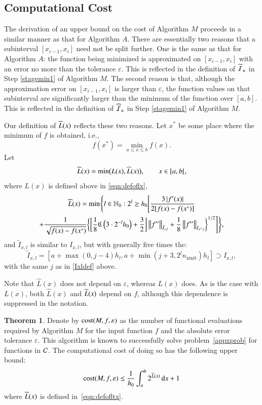 \documentclass[review]{elsarticle}
\newcommand{\abstol}{\varepsilon}
\theoremstyle{definition}
\newcommand{\Ixl}{I_{x,l}}
\newcommand{\chL}{\widehat{L}}
\DeclareMathOperator{\ninit}{ninit}
\newtheorem{theorem}{Theorem}
\begin{document}
\subsection{Computational Cost} \label{subsec:optcost}
The derivation of an upper bound on the cost of Algorithm $M$ proceeds in a
similar manner as that for Algorithm $A$. There are essentially two reasons that a
subinterval $[x_{i-1},x_i]$ need not be split further. One is the same as that
for Algorithm $A$: the function being minimized is approximated on
$[x_{i-1},x_i]$ with an error no more than the tolerance $\abstol$. This is reflected in the definition of $\widetilde{\mathcal{I}}_{\pm}$ in Step \ref{stagemin1} of Algorithm $M$.  The second
reason is that, although the approximation error on $[x_{i-1},x_i]$ is larger
than $\abstol$, the function values on that subinterval are significantly larger
than the minimum of the function over $[a,b]$.  This is reflected in the definition of $\widehat{\mathcal{I}}_{\pm}$ in Step \ref{stagemin1} of Algorithm $M$. 

Our definition of $\widetilde{L}(x)$ reflects these two reasons. Let $x^*$ be some place
where the minimum of $f$ is obtained, i.e.,
\[
f(x^*)  = \min_{a \le x \le b} f(x).
\]
Let
\begin{equation}\label{eqn:defofltx}
\tL(x) = \min\bigl(L(x),\chL(x)\bigr), \qquad x \in [a,b[,
\end{equation}
where $L(x)$ is defined above in \eqref{eqn:defoflx}, 
\begin{multline}\label{eqn:defoflt1x}
\chL(x) = \min \Biggl\{ l \in \mathbb{N}_0 :  2^l \ge h_0 \Biggl[ \frac{3\abs{f'(x)}}{2[f(x) - f(x^*)]} \\
+  \frac{1}{\sqrt{f(x) - f(x^*)}} \biggl\{ \biggl[\frac 18 \fC\left(3\cdot2^{-l}h_0\right) + \frac 32 \biggr]   \norm[\tilde{I}_{x,l}]{f''}
+ \frac18\norm[{I_{x^*,l}}]{f''} \biggr\}^{1/2} \Biggr] \Biggr\},
\end{multline}
and $\tilde{I}_{x,l}$ is similar to $\Ixl$, but with generally five times the:
\begin{equation}
\tilde{I}_{x,l}=\left[a+\max(0,j-4)h_l, a+ \min(j+3,2^l n_{\ninit})h_l\right] \supset \Ixl,
\end{equation}
with the same $j$ as in \eqref{Ixldef} above. 


Note that $\chL(x)$ does not depend on $\abstol$, whereas $L(x)$ does. As is the
case with $L(x)$, both $\chL(x)$ and $\widetilde{L}(x)$ depend on $f$, although this
dependence is suppressed in the notation.

\begin{theorem}\label{thm:Mcost}
	Denote by $\cost(M,f,\abstol)$ as the number of functional evaluations required by Algorithm $M$ for the input function $f$ and the absolute error tolerance $\abstol$.  This algorithm is known to successfully solve problem~\eqref{appxprob} for functions in $\mathcal{C}$.  The computational cost of doing so has the following upper bound:
	\begin{equation*}
	\cost(M,f,\abstol) \le \frac{1}{h_0}\int_a^b 2^{\tL(x)} \, \dif x +1 \\
	\end{equation*}
	where $\widetilde{L}(x)$ is defined in~\eqref{eqn:defofltx}.
\end{theorem}
\end{document}
